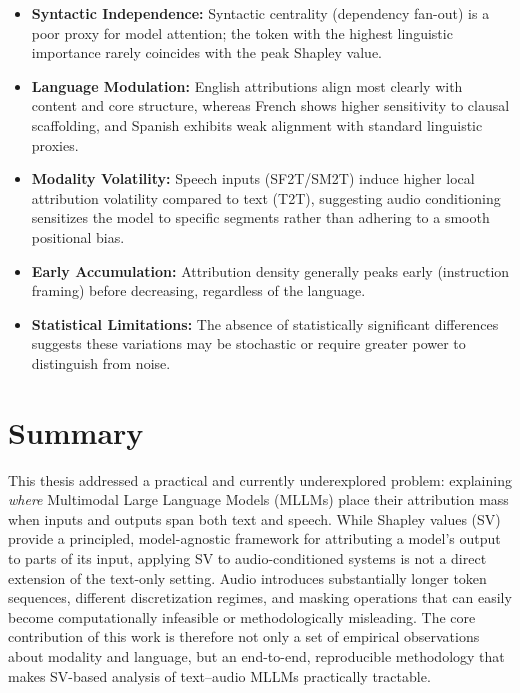\begin{itemize}
    \item \textbf{Syntactic Independence:} Syntactic centrality (dependency fan-out) is a poor proxy for model attention; the token with the highest linguistic importance rarely coincides with the peak Shapley value.

    \newpage
    \item \textbf{Language Modulation:} English attributions align most clearly with content and core structure, whereas French shows higher sensitivity to clausal scaffolding, and Spanish exhibits weak alignment with standard linguistic proxies.

    \item \textbf{Modality Volatility:} Speech inputs (SF2T/SM2T) induce higher local attribution volatility compared to text (T2T), suggesting audio conditioning sensitizes the model to specific segments rather than adhering to a smooth positional bias.

    \item \textbf{Early Accumulation:} Attribution density generally peaks early (instruction framing) before decreasing, regardless of the language.

    \item \textbf{Statistical Limitations:} The absence of statistically significant differences suggests these variations may be stochastic or require greater power to distinguish from noise.

\end{itemize}

\chapter{Summary}
\label{sec:summary}

This thesis addressed a practical and currently underexplored problem: explaining \emph{where} Multimodal Large Language Models (MLLMs) place their attribution mass when inputs and outputs span both text and speech. While Shapley values (SV) provide a principled, model-agnostic framework for attributing a model's output to parts of its input, applying SV to audio-conditioned systems is not a direct extension of the text-only setting. Audio introduces substantially longer token sequences, different discretization regimes, and masking operations that can easily become computationally infeasible or methodologically misleading. The core contribution of this work is therefore not only a set of empirical observations about modality and language, but an end-to-end, reproducible methodology that makes SV-based analysis of text–audio MLLMs practically tractable.

